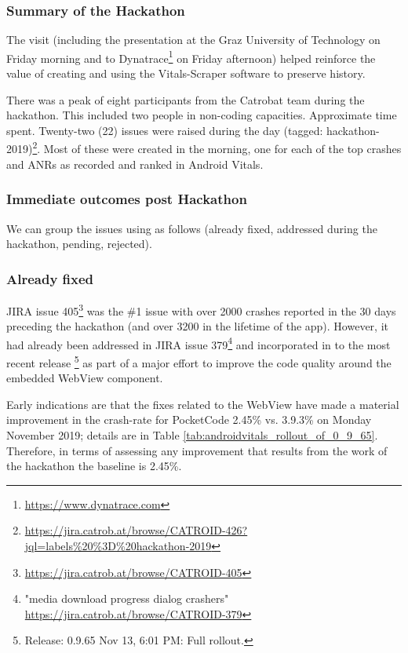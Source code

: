 \subsubsection{Summary of the Hackathon}
The visit (including the presentation at the Graz University of Technology on Friday morning and to Dynatrace\footnote{\url{https://www.dynatrace.com}} on Friday afternoon) helped reinforce the value of creating and using the Vitals-Scraper software to preserve history. 

There was a peak of eight participants from the Catrobat team during the hackathon. This included two people %
in non-coding capacities. Approximate time spent. Twenty-two (22) issues were raised during the day (tagged: hackathon-2019)\footnote{\url{https://jira.catrob.at/browse/CATROID-426?jql=labels\%20\%3D\%20hackathon-2019}}. Most of these were created in the morning, one for each of the top crashes and ANRs as recorded and ranked in Android Vitals. 

\subsubsection{Immediate outcomes post Hackathon}
We can group the issues using as follows (already fixed, addressed during the hackathon, pending, rejected).

\subsubsection{Already fixed} JIRA issue 405\footnote{\url{https://jira.catrob.at/browse/CATROID-405}} was the \#1 issue with over 2000 crashes reported in the 30 days preceding the hackathon (and over 3200 in the lifetime of the app). However, it had already been addressed in JIRA issue 379\footnote{"media download progress dialog crashers" \url{https://jira.catrob.at/browse/CATROID-379}} and incorporated in to the most recent release \footnote{Release:
0.9.65 Nov 13, 6:01 PM: Full rollout.} as part of a major effort to improve the code quality around the embedded WebView component.

Early indications are that the fixes related to the WebView have made a material improvement in the crash-rate for PocketCode 2.45\% vs. 3.9.3\% on Monday  November 2019; details are in Table \ref{tab:androidvitals_rollout_of_0_9_65}. Therefore, in terms of assessing any improvement that results from the work of the hackathon the baseline is 2.45\%.

